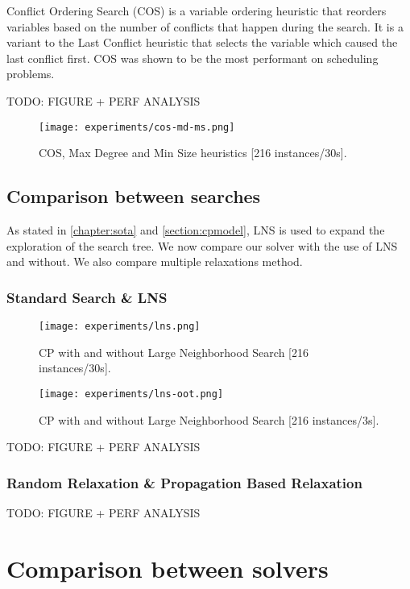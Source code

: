 \documentclass[../../thesis.tex]{subfiles}
\begin{document}
Conflict Ordering Search (COS) \cite{Gay:COS} is a variable ordering heuristic that 
reorders variables based on the number of conflicts that happen during the search.
It is a variant to the Last Conflict heuristic that selects the variable which caused the last conflict first.
COS was shown to be the most performant on scheduling problems.


TODO: FIGURE + PERF ANALYSIS

\begin{figure}
  \centering
  \texttt{[image: experiments/cos-md-ms.png]}
  \caption{COS, Max Degree and Min Size heuristics [216 instances/30s].}
  \label{experiments:heuristics:3}
\end{figure}


\subsection{Comparison between searches}


As stated in \autoref{chapter:sota} and \autoref{section:cpmodel}, LNS is used to expand the exploration
of the search tree. We now compare our solver with the use of LNS and without. We also compare multiple 
relaxations method.


\subsubsection{Standard Search \& LNS}


\begin{figure}
  \centering
  \texttt{[image: experiments/lns.png]}
  \caption{CP with and without Large Neighborhood Search [216 instances/30s].}
  \label{experiments:lns}
\end{figure}

\begin{figure}
  \centering
  \texttt{[image: experiments/lns-oot.png]}
  \caption{CP with and without Large Neighborhood Search [216 instances/3s].}
  \label{experiments:lns-oot}
\end{figure}


TODO: FIGURE + PERF ANALYSIS


\subsubsection{Random Relaxation \& Propagation Based Relaxation}

TODO: FIGURE + PERF ANALYSIS

\section{Comparison between solvers}
\end{document}
